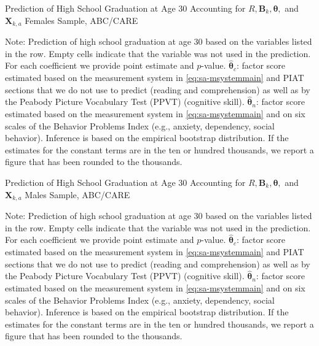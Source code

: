 \begin{table}
\begin{threeparttable}
\caption{Prediction of High School Graduation at Age 30 Accounting for $R, \bm{B}_k, \bm{\theta},$ and $\bm{X}_{k,a}$ Females Sample, ABC/CARE}
\label{table:end2}
\centering
\scriptsize

\begin{tablenotes}
\footnotesize
\item Note: Prediction of high school graduation at age 30 based on the variables listed in the row. Empty cells indicate that the variable was not used in the prediction. For each coefficient we provide point estimate and $p$-value. $\hat{\bm{\theta}}_{c}$: factor score estimated based on the measurement system in \eqref{eq:sa-msystemmain} and PIAT sections that we do not use to predict (reading and comprehension) as well as by the Peabody Picture Vocabulary Test (PPVT) (cognitive skill). $\hat{\bm{\theta}}_{n}$: factor score estimated based on the measurement system in \eqref{eq:sa-msystemmain} and on six scales of the Behavior Problems Index (e.g., anxiety, dependency, social behavior). Inference is based on the empirical bootstrap distribution. If the estimates for the constant terms are in the ten or hundred thousands, we report a figure that has been rounded to the thousands.
\end{tablenotes}
\end{threeparttable}
\end{table}

\begin{table}
\begin{threeparttable}
\caption{Prediction of High School Graduation at Age 30 Accounting for $R, \bm{B}_k, \bm{\theta},$ and $\bm{X}_{k,a}$ Males Sample, ABC/CARE}
\label{table:end2}
\centering
\scriptsize

\begin{tablenotes}
\footnotesize
\item Note: Prediction of high school graduation at age 30 based on the variables listed in the row. Empty cells indicate that the variable was not used in the prediction. For each coefficient we provide point estimate and $p$-value. $\hat{\bm{\theta}}_{c}$: factor score estimated based on the measurement system in \eqref{eq:sa-msystemmain} and PIAT sections that we do not use to predict (reading and comprehension) as well as by the Peabody Picture Vocabulary Test (PPVT) (cognitive skill). $\hat{\bm{\theta}}_{n}$: factor score estimated based on the measurement system in \eqref{eq:sa-msystemmain} and on six scales of the Behavior Problems Index (e.g., anxiety, dependency, social behavior). Inference is based on the empirical bootstrap distribution. If the estimates for the constant terms are in the ten or hundred thousands, we report a figure that has been rounded to the thousands.
\end{tablenotes}
\end{threeparttable}
\end{table}


